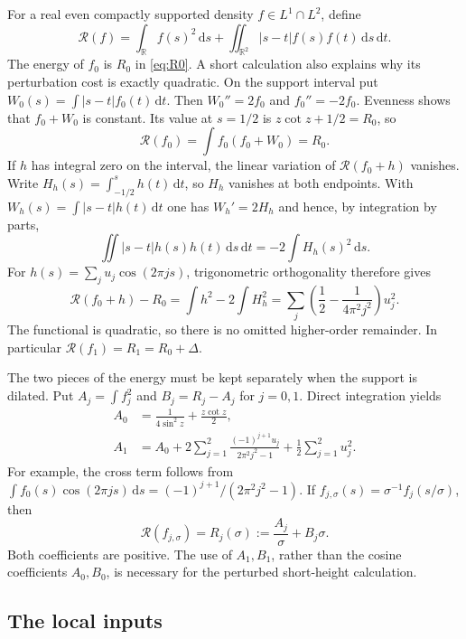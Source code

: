 \documentclass[11pt]{amsart}
\numberwithin{equation}{section}
\newcommand{\R}{\mathbb R}
\newcommand{\dd}{\,\mathrm d}
\begin{document}
For a real even compactly supported density $f\in L^1\cap L^2$, define
\begin{equation}
 \mathcal R(f)=\int_\R f(s)^2\dd s+
 \iint_{\R^2}|s-t|f(s)f(t)\dd s\dd t.\label{eq:energyfunctional}
\end{equation}
The energy of $f_0$ is $R_0$ in \eqref{eq:R0}. A short calculation
also explains why its perturbation cost is exactly quadratic. On the
support interval put $W_0(s)=\int|s-t|f_0(t)\dd t$. Then
$W_0''=2f_0$ and $f_0''=-2f_0$. Evenness shows that $f_0+W_0$
is constant. Its value at $s=1/2$ is
$z\cot z+1/2=R_0$, so
\[
 \mathcal R(f_0)=\int f_0(f_0+W_0)=R_0.
\]
If $h$ has integral zero on the interval, the linear variation of
$\mathcal R(f_0+h)$ vanishes. Write
$H_h(s)=\int_{-1/2}^s h(t)\dd t$, so $H_h$ vanishes at both
endpoints. With $W_h(s)=\int|s-t|h(t)\dd t$ one has
$W_h'=2H_h$ and hence, by integration by parts,
\[
 \iint |s-t|h(s)h(t)\dd s\dd t=-2\int H_h(s)^2\dd s.
\]
For $h(s)=\sum_j u_j\cos(2\pi js)$, trigonometric orthogonality
therefore gives
\begin{equation}
 \mathcal R(f_0+h)-R_0
 =\int h^2-2\int H_h^2
 =\sum_j\left(\frac12-\frac1{4\pi^2j^2}\right)u_j^2.
 \label{eq:energyperturbation}
\end{equation}
The functional is quadratic, so there is no omitted higher-order
remainder. In particular $\mathcal R(f_1)=R_1=R_0+\Delta$.

The two pieces of the energy must be kept separately when the support
is dilated. Put $A_j=\int f_j^2$ and $B_j=R_j-A_j$ for $j=0,1$.
Direct integration yields
\begin{align}
 A_0&=\frac1{4\sin^2z}+\frac{z\cot z}{2},\label{eq:A0}\\
 A_1&=A_0+2\sum_{j=1}^2
       \frac{(-1)^{j+1}u_j}{2\pi^2j^2-1}
             +\frac12\sum_{j=1}^2u_j^2.\label{eq:A1}
\end{align}
For example, the cross term follows from
$\int f_0(s)\cos(2\pi js)\dd s=(-1)^{j+1}/(2\pi^2j^2-1)$.
If $f_{j,\sigma}(s)=\sigma^{-1}f_j(s/\sigma)$, then
\begin{equation}
 \mathcal R(f_{j,\sigma})=R_j(\sigma)
 :=\frac{A_j}{\sigma}+B_j\sigma.\label{eq:dilatedenergy}
\end{equation}
Both coefficients are positive. The use of $A_1,B_1$, rather than
the cosine coefficients $A_0,B_0$, is necessary for the perturbed
short-height calculation.

\subsection{The local inputs}
\end{document}
